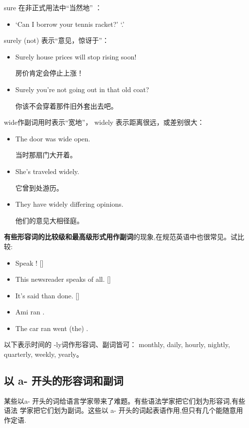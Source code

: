 sure 在非正式用法中“当然地” ：
\begin{itemize}
\item `Can I borrow your tennis racket?' `.'
\end{itemize}

surely (not) 表示“意见，惊讶于”：
\begin{itemize}
\item Surely house prices will stop rising soon!

  房价肯定会停止上涨！
\item Surely you're not going out in that old coat?

  你该不会穿着那件旧外套出去吧。
\end{itemize}

wide作副词用时表示“宽地”， widely 表示距离很远，或差别很大：
\begin{itemize}
\item The door was wide open.

  当时那扇门大开着。
\item She's traveled widely.

  它曾到处游历。
\item They have widely differing opinions.

  他们的意见大相径庭。
\end{itemize}


\textbf{有些形容词的比较级和最高级形式用作副词}的现象,在规范英语中也很常见。试比较:
\begin{itemize}
\item Speak ! []
\item This newsreader speaks  of all. []
\item It's  said than done. []
\item Ami ran .
\item The car ran went (the) .
\end{itemize}

以下表示时间的 -ly词作形容词、副词皆可： monthly, daily, hourly, nightly,
quarterly, weekly, yearly。

\subsection{以 a- 开头的形容词和副词}

某些以a- 开头的词给语言学家带来了难题。有些语法学家把它们划为形容词,有些语法
学家把它们划为副词。这些以 a- 开头的词起表语作用,但只有几个能随意用作定语.

